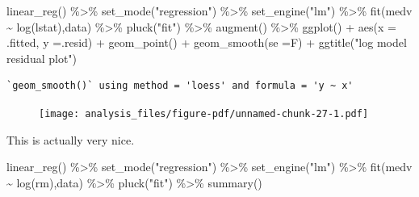\documentclass[
  letterpaper,
  DIV=11,
  numbers=noendperiod]{scrreprt}
\newenvironment{Shaded}{\begin{snugshade}}{\end{snugshade}}
\newcommand{\AttributeTok}[1]{\textcolor[rgb]{0.65,0.35,0.00}{#1}}
\newcommand{\FunctionTok}[1]{\textcolor[rgb]{0.02,0.16,0.49}{#1}}
\newcommand{\NormalTok}[1]{\textcolor[rgb]{0.33,0.33,0.33}{#1}}
\newcommand{\SpecialCharTok}[1]{\textcolor[rgb]{0.00,0.46,0.62}{#1}}
\newcommand{\StringTok}[1]{\textcolor[rgb]{0.00,0.50,0.00}{#1}}
\begin{document}
\begin{Shaded}
\begin{Highlighting}[]
\FunctionTok{linear\_reg}\NormalTok{() }\SpecialCharTok{\%\textgreater{}\%} 
  \FunctionTok{set\_mode}\NormalTok{(}\StringTok{"regression"}\NormalTok{) }\SpecialCharTok{\%\textgreater{}\%} 
  \FunctionTok{set\_engine}\NormalTok{(}\StringTok{"lm"}\NormalTok{) }\SpecialCharTok{\%\textgreater{}\%} 
  \FunctionTok{fit}\NormalTok{(medv }\SpecialCharTok{\textasciitilde{}} \FunctionTok{log}\NormalTok{(lstat),data) }\SpecialCharTok{\%\textgreater{}\%} 
  \FunctionTok{pluck}\NormalTok{(}\StringTok{"fit"}\NormalTok{) }\SpecialCharTok{\%\textgreater{}\%} 
  \FunctionTok{augment}\NormalTok{() }\SpecialCharTok{\%\textgreater{}\%} 
  \FunctionTok{ggplot}\NormalTok{() }\SpecialCharTok{+} \FunctionTok{aes}\NormalTok{(}\AttributeTok{x =}\NormalTok{ .fitted, }\AttributeTok{y =}\NormalTok{.resid) }\SpecialCharTok{+} \FunctionTok{geom\_point}\NormalTok{() }\SpecialCharTok{+} \FunctionTok{geom\_smooth}\NormalTok{(}\AttributeTok{se =}\NormalTok{F) }\SpecialCharTok{+} \FunctionTok{ggtitle}\NormalTok{(}\StringTok{"log model residual plot"}\NormalTok{) }
\end{Highlighting}
\end{Shaded}

\begin{verbatim}
`geom_smooth()` using method = 'loess' and formula = 'y ~ x'
\end{verbatim}

\begin{figure}[H]

{\centering \texttt{[image: analysis\_files/figure-pdf/unnamed-chunk-27-1.pdf]}

}

\end{figure}

This is actually very nice.

\begin{Shaded}
\begin{Highlighting}[]
\FunctionTok{linear\_reg}\NormalTok{() }\SpecialCharTok{\%\textgreater{}\%} 
  \FunctionTok{set\_mode}\NormalTok{(}\StringTok{"regression"}\NormalTok{) }\SpecialCharTok{\%\textgreater{}\%} 
  \FunctionTok{set\_engine}\NormalTok{(}\StringTok{"lm"}\NormalTok{) }\SpecialCharTok{\%\textgreater{}\%} 
  \FunctionTok{fit}\NormalTok{(medv }\SpecialCharTok{\textasciitilde{}} \FunctionTok{log}\NormalTok{(rm),data) }\SpecialCharTok{\%\textgreater{}\%} 
  \FunctionTok{pluck}\NormalTok{(}\StringTok{"fit"}\NormalTok{) }\SpecialCharTok{\%\textgreater{}\%} 
  \FunctionTok{summary}\NormalTok{()}
\end{Highlighting}
\end{Shaded}
\end{document}
